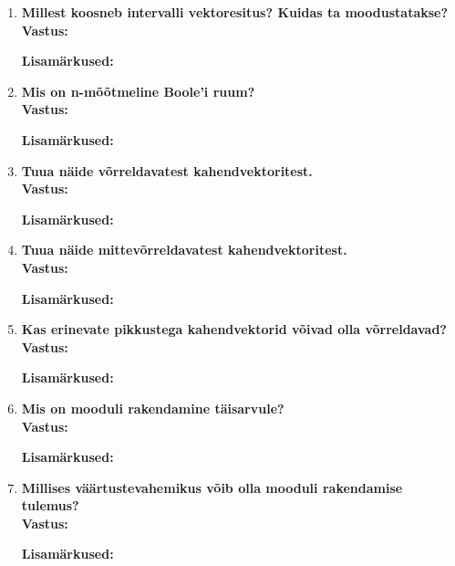 \documentclass[a4paper,12pt]{article}
\makeatletter
\newenvironment{question}[1]{%
  \item \textbf{#1} \vspace{0.5em} \\ %
  \textbf{Vastus:} \vspace{0.25em} \\ %
  \def\@lisamarkused{} %
}{%
  \if\relax\detokenize\expandafter{\@lisamarkused}\relax %
  \else
    \vspace{0.5em} %
    \textbf{Lisamärkused:} \\ %
    \@lisamarkused %
  \fi
  \vspace{1em} %
}
\makeatother
\begin{document}
\begin{enumerate}[left=0pt]
\begin{question}{Millest koosneb intervalli vektoresitus? Kuidas ta moodustatakse?}
\end{question}

\begin{question}{Mis on n-mõõtmeline Boole'i ruum?}
\end{question}

\begin{question}{Tuua näide võrreldavatest kahendvektoritest.}
\end{question}

\begin{question}{Tuua näide mittevõrreldavatest kahendvektoritest.}
\end{question}

\begin{question}{Kas erinevate pikkustega kahendvektorid võivad olla võrreldavad?}
\end{question}

\begin{question}{Mis on mooduli rakendamine täisarvule?}
\end{question}

\begin{question}{Millises väärtustevahemikus võib olla mooduli rakendamise tulemus?}
\end{question}

\end{enumerate}
\end{document}
